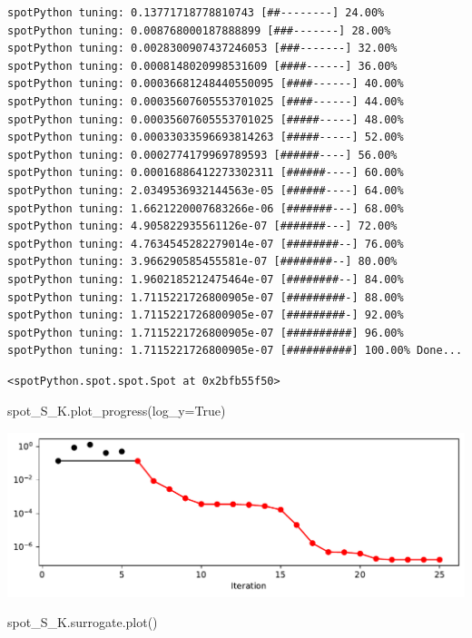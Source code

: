 \documentclass[
  letterpaper,
  DIV=11,
  numbers=noendperiod]{scrreprt}
\newenvironment{Shaded}{\begin{snugshade}}{\end{snugshade}}
\newcommand{\NormalTok}[1]{\textcolor[rgb]{0.00,0.23,0.31}{#1}}
\newcommand{\OperatorTok}[1]{\textcolor[rgb]{0.37,0.37,0.37}{#1}}
\newcommand{\VariableTok}[1]{\textcolor[rgb]{0.07,0.07,0.07}{#1}}
\begin{document}
\begin{verbatim}
spotPython tuning: 0.13771718778810743 [##--------] 24.00% 
spotPython tuning: 0.008768000187888899 [###-------] 28.00% 
spotPython tuning: 0.0028300907437246053 [###-------] 32.00% 
spotPython tuning: 0.0008148020998531609 [####------] 36.00% 
spotPython tuning: 0.00036681248440550095 [####------] 40.00% 
spotPython tuning: 0.00035607605553701025 [####------] 44.00% 
spotPython tuning: 0.00035607605553701025 [#####-----] 48.00% 
spotPython tuning: 0.00033033596693814263 [#####-----] 52.00% 
spotPython tuning: 0.0002774179969789593 [######----] 56.00% 
spotPython tuning: 0.00016886412273302311 [######----] 60.00% 
spotPython tuning: 2.0349536932144563e-05 [######----] 64.00% 
spotPython tuning: 1.6621220007683266e-06 [#######---] 68.00% 
spotPython tuning: 4.905822935561126e-07 [#######---] 72.00% 
spotPython tuning: 4.7634545282279014e-07 [########--] 76.00% 
spotPython tuning: 3.966290585455581e-07 [########--] 80.00% 
spotPython tuning: 1.9602185212475464e-07 [########--] 84.00% 
spotPython tuning: 1.7115221726800905e-07 [#########-] 88.00% 
spotPython tuning: 1.7115221726800905e-07 [#########-] 92.00% 
spotPython tuning: 1.7115221726800905e-07 [##########] 96.00% 
spotPython tuning: 1.7115221726800905e-07 [##########] 100.00% Done...
\end{verbatim}

\begin{verbatim}
<spotPython.spot.spot.Spot at 0x2bfb55f50>
\end{verbatim}

\begin{Shaded}
\begin{Highlighting}[]
\NormalTok{spot\_S\_K.plot\_progress(log\_y}\OperatorTok{=}\VariableTok{True}\NormalTok{)}
\end{Highlighting}
\end{Shaded}

\includegraphics{012_num_spot_ei_files/figure-pdf/cell-39-output-1.pdf}

\begin{Shaded}
\begin{Highlighting}[]
\NormalTok{spot\_S\_K.surrogate.plot()}
\end{Highlighting}
\end{Shaded}
\end{document}

